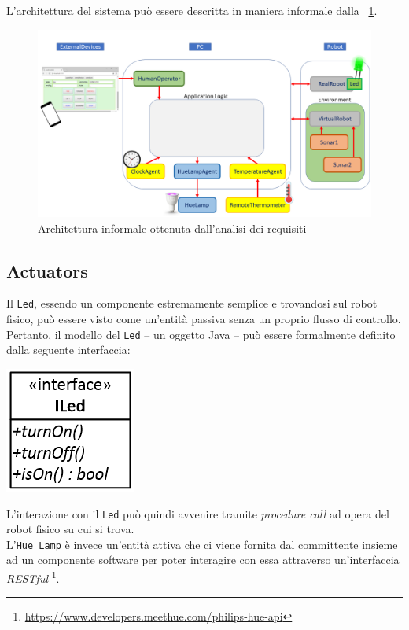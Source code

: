 \documentclass{../llncs}
\newcommand{\labelssec}[1]{\label{ssec:#1}}
\newcommand{\labelfig}[1]{\label{fig:#1}}
\newcommand{\xf}[1]{\figurename~\ref{fig:#1}}
\begin{document}
L'architettura del sistema può essere descritta in maniera informale dalla \xf{informalRA}.
\begin{figure}[!htb]
\centering
\includegraphics[scale=0.4]{img/informalArchitecture1.png}
\caption{Architettura informale ottenuta dall'analisi dei requisiti}\labelfig{informalRA}
\end{figure}

\subsection{Actuators}
\labelssec{actuatorsRA}
Il \texttt{Led}, essendo un componente estremamente semplice e trovandosi sul robot fisico, può essere visto come un'entità passiva senza un proprio flusso di controllo. Pertanto, il modello del \texttt{Led} -- un oggetto Java -- può essere formalmente definito dalla seguente interfaccia:

\begin{center}
\includegraphics[scale=0.4]{img/iled.png}
\end{center}

L'interazione con il \texttt{Led} può quindi avvenire tramite \textit{procedure call} ad opera del robot fisico su cui si trova.\\

L'\texttt{Hue Lamp} è invece un'entità attiva che ci viene fornita dal committente insieme ad un componente software per poter interagire con essa attraverso un'interfaccia \textit{RESTful}
\footnote{\url{https://www.developers.meethue.com/philips-hue-api}}.
\end{document}
